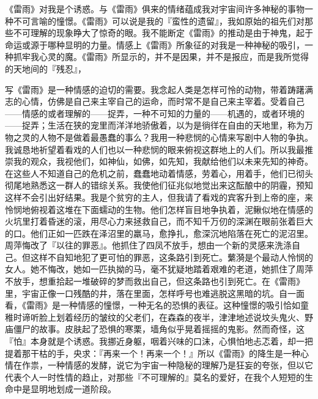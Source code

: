 《雷雨》对我是个诱惑。与《雷雨》俱来的情绪蕴成我对宇宙间许多神秘的事物一种不可言喻的憧憬。《雷雨》可以说是我的『蛮性的遗留』，我如原始的祖先们对那些不可理解的现象睁大了惊奇的眼。我不能断定《雷雨》的推动是由于神鬼，起于命运或源于哪种显明的力量。情感上《雷雨》所象征的对我是一种神秘的吸引，一种抓牢我心灵的魔。《雷雨》所显示的，并不是因果，并不是报应，而是我所觉得的天地间的『残忍』，

写《雷雨》是一种情感的迫切的需要。我念起人类是怎样可怜的动物，带着踌躇满志的心情，仿佛是自己来主宰自己的运命，而时常不是自己来主宰着。受着自己——情感的或者理解的——捉弄，一种不可知的力量的——机遇的，或者环境的——捉弄；生活在狭的宠里而洋洋地骄傲着，以为是徜徉在自由的天地里，称为万物之灵的人物不是做着最愚蠢的事么？我用一种悲悯的心情来写剧中人物的争执。我诚恳地祈望着看戏的人们也以一种悲悯的眼来俯视这群地上的人们。所以我最推崇我的观众，我视他们，如神仙，如佛，如先知，我献给他们以未来先知的神奇。在这些人不知道自己的危机之前，蠢蠢地动着情感，劳着心，用着手，他们已彻头彻尾地熟悉这一群人的错综关系。我使他们征兆似地觉出来这酝酿中的阴霾，预知这样不会引出好结果。我是个贫穷的主人，但我请了看戏的宾客升到上帝的座，来怜悯地俯视着这堆在下面蠕动的生物。他们怎样盲目地争执着，泥鳅似地在情感的火坑里打着昏迷的滚，用尽心力来拯救自己，而不知千万仞的深渊在眼前张着巨大的口。他们正如一匹跌在泽沼里的羸马，愈挣扎，愈深沉地陷落在死亡的泥沼里。周萍悔改了『以往的罪恶』。他抓住了四凤不放手，想由一个新的灵感来洗涤自己。但这样不自知地犯了更可怕的罪恶，这条路引到死亡。蘩漪是个最动人怜悯的女人。她不悔改，她如一匹执拗的马，毫不犹疑地踏着艰难的老道，她抓住了周萍不放手，想重拾起一堆破碎的梦而救出自己，但这条路也引到死亡。在《雷雨》里，宇宙正像一口残酷的井，落在里面，怎样呼号也难逃脱这黑暗的坑。自一面看，《雷雨》是一种情感的憧憬，一种无名的恐惧的表征。这种憧憬的吸引恰如童稚时谛听脸上划着经历的皱纹的父老们，在森森的夜半，津津地述说坟头鬼火、野庙僵尸的故事。皮肤起了恐惧的寒栗，墙角似乎晃着摇摇的鬼影。然而奇怪，这『怕』本身就是个诱惑。我挪近身躯，咽着兴味的口沫，心惧怕地忐忑着，却一把提着那干枯的手，央求：『再来一个！再来一个！』所以《雷雨》的降生是一种心情在作祟，一种情感的发酵，说它为宇宙一种隐秘的理解乃是狂妄的夸张，但以它代表个人一时性情的趋止，对那些『不可理解的』莫名的爱好，在我个人短短的生命中是显明地划成一道阶段。

